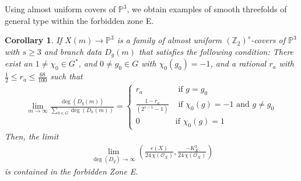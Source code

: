 \documentclass[12pt,twoside,]{amsart}
\theoremstyle{plain}
\newtheorem{corollary}[theorem]{Corollary}
\theoremstyle{definition}
\begin{document}
Using almost uniform covers of $\mathbb{P}^3$, we obtain examples of smooth threefolds of general type within the forbidden zone E.
\begin{corollary}
If $X(m) \rightarrow \mathbb{P}^3$ is a family of almost uniform $(\mathbb{Z}_2)^s$-covers of $\mathbb{P}^3$ with $s \geq 3$ and branch data $D_g(m)$ that satisfies the following condition: There exist an $1 \neq \chi_0 \in G^*$, and $0 \neq g_0 \in G$ with $\chi_0(g_0) = -1$, and a rational $r_a$ with $\frac{1}{2} \leq r_a \leq \frac{68}{100}$ such that
\begin{align*}
\lim_{m \to \infty}
 \frac{\deg(D_g(m))}{\sum_{h \in G} \deg(D_h(m))}
= \begin{cases}
r_a & \text{ if  $g= g_0$ }    
\\
\frac{1-r_a}{(2^{s-1}-1)} & \text{ if $\chi_0(g) =-1$ and $g \neq g_0$}   
\\
0 & \text{if $\chi_0(g) =1$}
\end{cases}
\end{align*}
Then, the limit 
\begin{align*}
\lim_{\deg(D_g) \to \infty}  \left(
\frac{e(X)}{24\,\chi(\mathcal{O}_X)} , 
    \frac{-K_X^3}{24\,\chi(\mathcal{O}_X)} \right)
\end{align*}
is contained in the forbidden Zone E.
\end{corollary}
\end{document}
